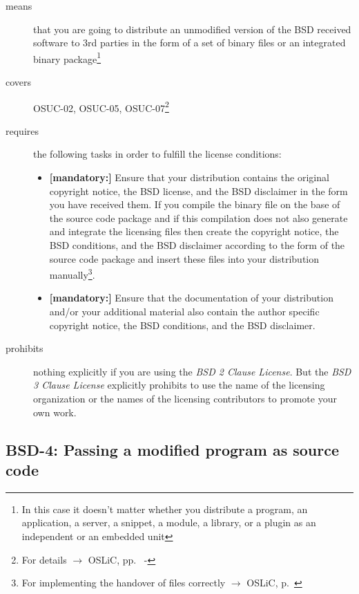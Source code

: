 \begin{description}
\item[means] that you are going to distribute an unmodified version of the BSD
received software to 3rd parties in the form of a set of binary files or an
integrated bi\-na\-ry package\footnote{In this case it doesn't matter whether
you distribute a program, an application, a server, a snippet, a module, a
library, or a plugin as an independent or an embedded unit}
\item[covers] OSUC-02, OSUC-05, OSUC-07\footnote{For details $\rightarrow$ OSLiC, pp.\
\pageref{OSUC-02-DEF} - \pageref{OSUC-07-DEF}}
\item[requires] the following tasks in order to fulfill the license conditions:
\begin{itemize}
  
  \item  \textbf{[mandatory:]} Ensure that your distribution contains the
  original copyright notice, the BSD license, and the BSD disclaimer in the form
  you have received them. If you compile the binary file on the base of the
  source code package and if this compilation does not also generate and
  integrate the licensing files then create the copyright notice, the BSD
  conditions, and the BSD disclaimer according to the form of the source code
  package and insert these files into your distribution manually\footnote{For
  implementing the handover of files correctly $\rightarrow$ OSLiC, p.\ 
  \pageref{DistributingFilesHint}}.
  
  \item  \textbf{[mandatory:]} Ensure that the documentation of your
  distribution and/or your additional material also contain the author specific
  copyright notice, the BSD conditions, and the BSD disclaimer.
\end{itemize}

\item[prohibits] nothing explicitly if you are using the \emph{BSD 2 Clause
License}. But the \emph{BSD 3 Clause License} explicitly prohibits to use the
name of the licensing organization or the names of the licensing contributors to
promote your own work.

\end{description}

\subsection{BSD-4: Passing a modified program as source code}
\label{OSUC-04-BSD}

